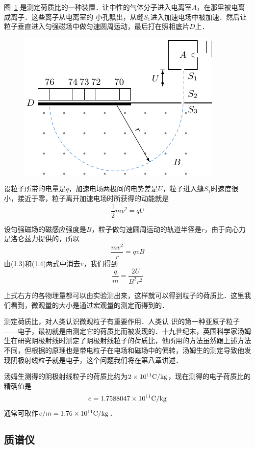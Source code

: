 图~\ref{fig_C_1-37} 是测定荷质比的一种装置．让中性的气体分子进入电离室$A$，在那里被电离成离子．这些离子从电离室的
小孔飘出，从缝$S_1$进入加速电场中被加速．然后让粒子垂直进入匀强磁场中做匀速圆周运动，最后打在照相底片$D$上．
\begin{figure}[htbp]
    \centering
    \includegraphics{fig/C/1-37.pdf}
    \caption{}\label{fig_C_1-37}
\end{figure}

设粒子所带的电量是$q$，加速电场两极间的电势差是$U$，粒子进入缝$S_1$时速度很小，接近于零，粒子离开加速电场时所获得的动能就是
\begin{equation}
\frac{1}{2}mv^2=qU    
\end{equation}

设匀强磁场的磁感应强度是$B$，粒子做匀速圆周运动的轨道半径是$r$，由于向心力是洛仑兹力提供的，所以
\begin{equation}
    \frac{mv^2}{r}=qvB
\end{equation}
由(1.3)和(1.4)两式中消去$v$，我们得到
\[\frac{q}{m}=\frac{2U}{B^2r^2}\]

上式右方的各物理量都可以由实验测出来，这样就可以得到粒子的荷质比．这里我们看到，微观量的大小是通过宏观量的测定而得到的．

测定荷质比，对人类认识微观粒子有重要作用．人类认
识的第一种亚原子粒子——电子，最初就是由测定它的荷质比而被发现的．十九世纪末，英国科学家汤姆生在研究阴极射线时测定了阴极射线粒子的荷质比，他所用的方法虽然跟上述方法不同，但根据的原理也是带电粒子在电场和磁场中的偏转，汤姆生的测定导致他发现阴极射线粒子就是电子，这个问题我们将在第八章讲述．

汤姆生测得的阴极射线粒子的荷质比约为$2\times10^{11}{\rm C}/{\rm kg}$，现在测得的电子荷质比的精确值是
\[e=1.7588047\times10^{11}{\rm C}/{\rm kg}\]
通常可取作$e/m=1.76\times10^{11}{\rm C}/{\rm kg}$．

\subsection{质谱仪}

